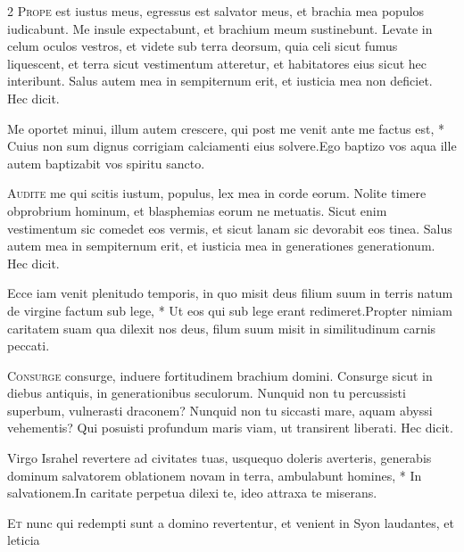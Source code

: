 \begin{multicols*}{2}
\lettrine[lines=2]{\zallmancaps \color{Red} P}{rope} est iustus meus, egressus est salvator meus, et brachia mea populos iudicabunt. Me insule expectabunt, et brachium meum sustinebunt. Levate in celum oculos vestros, et videte sub terra deorsum, quia celi sicut fumus liquescent, et terra sicut vestimentum atteretur, et habitatores eius sicut hec interibunt. Salus autem mea in sempiternum erit, et iusticia mea non deficiet. Hec dicit.
\begin{responsory-doxology}[me-oportet]
{Me oportet minui, illum autem crescere, qui post me venit ante me factus est, * Cuius non sum dignus corrigiam calciamenti eius solvere.}{Ego baptizo vos aqua ille autem baptizabit vos spiritu sancto.}
\end{responsory-doxology}%
\lettrine[lines=2]{\zallmancaps \color{Blue} A}{udite} me qui scitis iustum, populus, lex mea in corde eorum. Nolite timere obprobrium hominum, et blasphemias eorum ne metuatis. Sicut enim vestimentum sic comedet eos vermis, et sicut lanam sic devorabit eos tinea. Salus autem mea in sempiternum erit, et iusticia mea in generationes generationum. Hec dicit.
\begin{responsory}
{Ecce iam venit plenitudo temporis, in quo misit deus filium suum in terris natum de virgine factum sub lege, * Ut eos qui sub lege erant redimeret.}{Propter nimiam caritatem suam qua dilexit nos deus, filum suum misit in similitudinum carnis peccati.}
\end{responsory}%
\lettrine[lines=2]{\zallmancaps \color{Red} C}{onsurge} consurge, induere fortitudinem brachium domini. Consurge sicut in diebus antiquis, in generationibus seculorum. Nunquid non tu percussisti superbum, vulnerasti draconem? Nunquid non tu siccasti mare, aquam abyssi vehementis? Qui posuisti profundum maris viam, ut transirent liberati. Hec dicit.
\begin{responsory}
{Virgo Israhel revertere ad civitates tuas, usquequo doleris averteris, generabis dominum salvatorem oblationem novam in terra, ambulabunt homines, * In salvationem.}{In caritate perpetua dilexi te, ideo attraxa te miserans.}
\end{responsory}%
\lettrine[lines=2]{\zallmancaps \color{Blue} E}{t} nunc qui redempti sunt a domino revertentur, et venient in Syon laudantes, et leticia

\end{multicols*}
